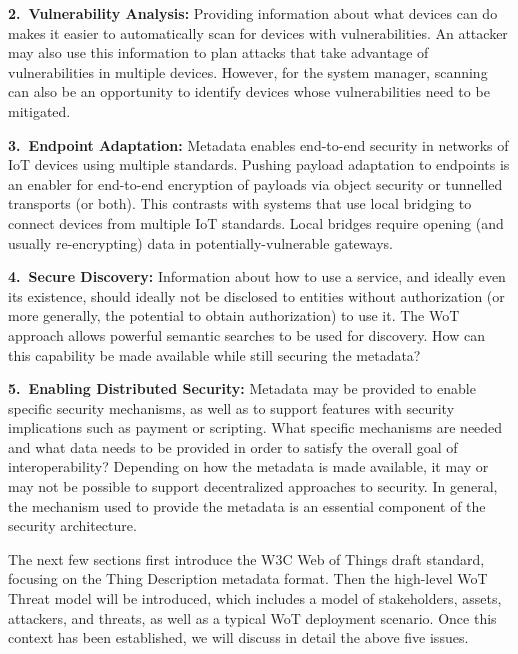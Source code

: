 \noindent\textbf{2.~Vulnerability Analysis:}
Providing information about what devices can do makes it easier to 
automatically scan for devices with vulnerabilities.
An attacker may also use this information to plan attacks that take advantage of 
vulnerabilities in multiple devices. 
However, for the system manager, scanning can also be an opportunity 
to identify devices whose vulnerabilities need to be mitigated.

\noindent\textbf{3.~Endpoint Adaptation:}
Metadata enables end-to-end security in networks of IoT devices using multiple standards.
Pushing payload adaptation to endpoints is an enabler for
end-to-end encryption of payloads via object security or tunnelled transports (or both).
This contrasts with systems that use local bridging to connect devices from multiple IoT standards.
Local bridges require opening (and usually re-encrypting) data in potentially-vulnerable gateways.

\noindent\textbf{4.~Secure Discovery:}
Information about how to use a service, 
and ideally even its existence, should ideally not
be disclosed to entities without authorization
(or more generally, the potential to obtain authorization) to use it.
The WoT approach allows powerful semantic searches to be used for discovery.
How can this capability be made available while still securing the metadata?

\noindent\textbf{5.~Enabling Distributed Security:}
Metadata may be provided to enable specific security mechanisms,
as well as to support features with security implications such as payment or scripting.
What specific mechanisms are needed and what data needs to be provided
in order to satisfy the overall goal of interoperability?
Depending on how the metadata is made available, it may or may not be 
possible to support decentralized approaches to security.
In general, the mechanism used to provide the metadata is
an essential component of the security architecture.

The next few sections first introduce the W3C Web of Things draft standard,
focusing on the Thing Description metadata format.  
Then the high-level WoT Threat model will be introduced,
which includes a model of stakeholders, assets, attackers,
and threats, as well as a typical WoT deployment scenario.
Once this context has been established, we will discuss in detail the above
five issues.

